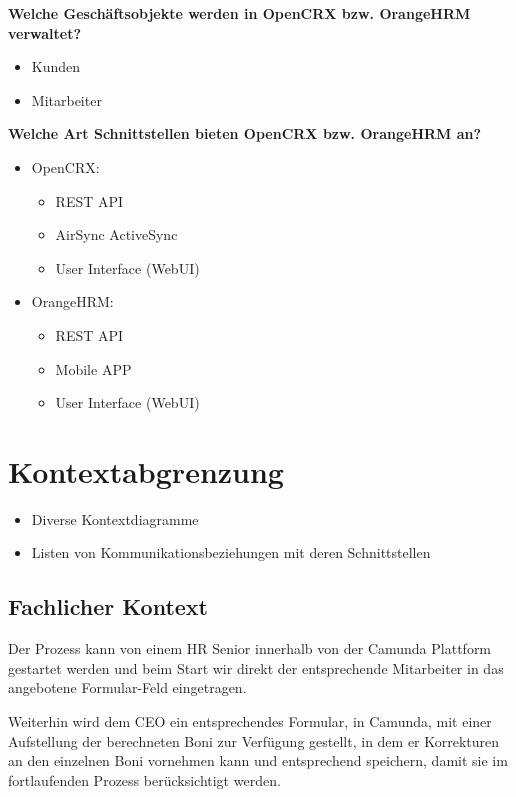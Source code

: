 \documentclass[]{article}
\begin{document}
\textbf{Welche Geschäftsobjekte werden in OpenCRX bzw. OrangeHRM verwaltet?}
\begin{itemize}
	\item Kunden
	\item Mitarbeiter
\end{itemize}
\textbf{Welche Art Schnittstellen bieten OpenCRX bzw. OrangeHRM an?}
	\begin{itemize}
	\item OpenCRX:
	\begin{itemize}
		\item REST API
		\item AirSync ActiveSync
		\item User Interface (WebUI)
	\end{itemize}
	\item OrangeHRM:
		\begin{itemize}
			\item REST API
			\item Mobile APP
			\item User Interface (WebUI)
		\end{itemize}
\end{itemize}


\hypertarget{section-system-scope-and-context}{%
\section{Kontextabgrenzung}\label{section-system-scope-and-context}}
\begin{itemize}
\item
  Diverse Kontextdiagramme
\item
  Listen von Kommunikationsbeziehungen mit deren Schnittstellen
\end{itemize}

\hypertarget{_fachlicher_kontext}{%
\subsection{Fachlicher Kontext}\label{_fachlicher_kontext}}

Der Prozess kann von einem HR Senior innerhalb von der Camunda Plattform gestartet werden und beim Start wir direkt der entsprechende Mitarbeiter in das angebotene Formular-Feld eingetragen.

Weiterhin wird dem CEO ein entsprechendes Formular, in Camunda, mit einer Aufstellung der berechneten Boni zur Verfügung gestellt, in dem er Korrekturen an den einzelnen Boni vornehmen kann und entsprechend speichern, damit sie im fortlaufenden Prozess berücksichtigt werden.
\end{document}
